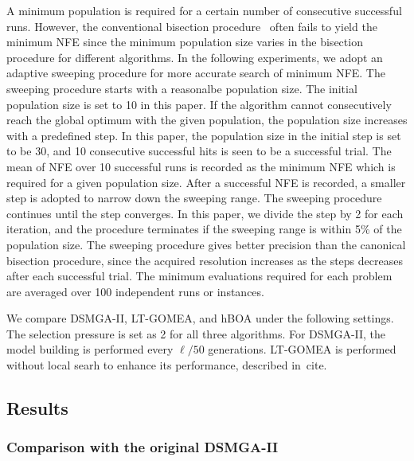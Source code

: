\documentclass{sig-alternate-05-2015}
\begin{document}
A minimum population is required for a certain number of consecutive successful runs.
However, the conventional bisection procedure~\cite{pelikan:hBOA} often fails to yield the minimum NFE  since the minimum population size varies in the bisection procedure for different algorithms.
In the following experiments, we adopt an adaptive sweeping procedure for more accurate search of minimum NFE.
The sweeping procedure starts with a reasonalbe population size.
The initial population size is set to 10 in this paper.
If the algorithm cannot consecutively reach the global optimum with the given population, the population size increases with a predefined step.
In this paper, the population size in the initial step is set to be 30, and 10 consecutive successful hits is seen to be a successful trial.
The mean of NFE over 10 successful runs is recorded as the minimum NFE which is required for a given population size.
After a successful NFE is recorded, a smaller step is adopted to narrow down the sweeping range.
The sweeping procedure continues until the step converges.
In this paper, we divide the step by 2 for each iteration, and the procedure terminates if the sweeping range is within 5\% of the population size.
The sweeping procedure gives better precision than the canonical bisection procedure, since the acquired resolution increases as the steps decreases after each successful trial.
The minimum evaluations required for each problem are averaged over 100 independent runs or instances.

We compare DSMGA-II, LT-GOMEA, and hBOA under the following settings. The selection pressure is set as 2 for all three algorithms. 
For DSMGA-II, the model building is performed every $\ell/50$ generations.
LT-GOMEA is performed without local searh to enhance its performance, described in~cite{}.




\subsection{Results}

\subsubsection{ Comparison with the original DSMGA-II }
\end{document}
